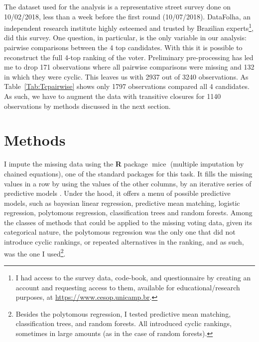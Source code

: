 \documentclass[hidelinks,11pt]{article} \usepackage[utf8]{inputenc}
\begin{document}
The dataset used for the analysis is a representative street survey done on
10/02/2018, less than a week before the first round (10/07/2018). DataFolha, an
independent research institute highly esteemed and trusted by Brazilian
experts\footnote{I had access to the survey data, code-book, and questionnaire
by creating an account and requesting access to them, available for
educational/research purposes, at \url{https://www.cesop.unicamp.br}.}, did this
survey. One question, in particular, is the only variable in our analysis:
pairwise comparisons between the 4 top candidates. With this it is possible to
reconstruct the full 4-top ranking of the voter. Preliminary pre-processing has
led me to drop 171 observations where all pairwise comparisons were missing and
132 in which they were cyclic. This leaves us with 2937 out of 3240
observations. As Table~\ref{Tab:Tcpairwise} shows only 1797 observations
compared all 4 candidates. As such, we have to augment the data with transitive
closures for 1140 observations by methods discussed in the next section.

\begin{table}[]\centering {}
\caption{Frequency of pairwise comparisons in the dataset.}

\label{Tab:Tcpairwise}
\end{table}


\section{Methods}

I impute the missing data using the \textbf{\textsf{R}} package
\(\operatorname{mice}\) (multiple imputation by chained equations), one of the
standard packages for this task. It fills the missing values in a row by using
the values of the other columns, by an iterative series of predictive models
\parencite{vanbuuren2018imputation}. Under the hood, it offers a menu of
possible predictive models, such as bayesian linear regression, predictive mean
matching, logistic regression, polytomous regression, classification trees and
random forests. Among the classes of methods that could be applied to the
missing voting data, given its categorical nature, the polytomous regression was
the only one that did not introduce cyclic rankings, or repeated alternatives in
the ranking, and as such, was the one I used\footnote{Besides the polytomous
regression, I tested predictive mean matching, classification trees, and random
forests. All introduced cyclic rankings, sometimes in large amounts (as in the
case of random forests).}.
\end{document}
